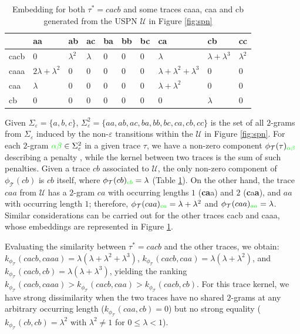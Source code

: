 {\begin{table}[!t]
\caption{Embedding for both $\tau^*=cacb$ and some traces caaa, caa and cb generated from the USPN $\mathcal{U}$ in Figure \ref{fig:spn}}\label{tb:embedding}
\begin{center}
	\begin{tabular}{l@{\quad }l@{\quad }l@{\quad }l@{\quad }l@{\quad }l@{\quad }l@{\quad }l@{\quad }l@{\quad }l}
		\toprule
		& aa    & ab   & ac    & ba   & bb   & bc & ca & cb & cc   \\
		\midrule
		cacb & $0$ & $\lambda^2$ & $\lambda$ & $0$  & $0$  & $0$ & $\lambda$ & $\lambda+\lambda^3$ & $\lambda^2$\\
		caaa & $2\lambda+\lambda^2$& $0$ & $0$ & $0$ & $0$ & $0$ & $\lambda+\lambda^2+\lambda^3$ & $0$ & $0$ \\
		caa  & $\lambda$ & $0$ & $0$ & $0$ & $0$ & $0$ & $\lambda+\lambda^2$ & $0$&  $0$\\
		cb   & $0$ & $0$ & $0$ & $0$ & $0$ & $0$ & $0$ & $\lambda$& $0$ \\
		\bottomrule
	\end{tabular}
\end{center}
\end{table}
\begin{example}\label{ex:wheredotiszero}
Given $\Sigma_\varepsilon=\{a,b,c\}$, $\Sigma^2_\varepsilon=\{aa,ab,ac,ba,bb,bc,ca,cb,cc\}$ is the set of all $2$-grams 
from $\Sigma_\varepsilon$ induced by the non-$\varepsilon$ transitions within the \uswn $\mathcal{U}$ in Figure \ref{fig:spn}. 
For each $2$-gram ${\color{green}\alpha\beta}\in\Sigma_\varepsilon^2$ in a given trace $\tau$, we have a non-zero component 
$\phi_{\mathcal{T}}(\tau)_{\color{green}\alpha\beta}$ describing a penalty \cite{Gartner03}, while the kernel between two 
traces is the sum of such penalties. Given a trace $cb$ associated to $\mathcal{U}$,  the only non-zero component of 
$\phi_{\mathcal{T}}(cb)$ is $cb$ itself, where $\phi_{\mathcal{T}}(cb)_{\color{green}cb}=\lambda$ (Table \ref{tb:embedding}). 
On the other hand, the trace $caa$ from $\mathcal{U}$ has a $2$-gram $ca$ with occurring lengths $1$ (\textbf{ca}a) and $2$ (\textbf{c}a\textbf{a}), and $aa$ with occurring length $1$; therefore, $\phi_{\mathcal{T}}(caa)_{\color{green}ca}=\lambda+\lambda^2$ and  $\phi_{\mathcal{T}}(caa)_{\color{green}aa}=\lambda$.  Similar considerations can be carried out for the other traces cacb and caaa, whose embeddings are represented in Figure \ref{tb:embedding}. 

Evaluating the similarity between $\tau^*=cacb$ and the other traces, we obtain: 
$k_{\phi_{\mathcal{T}}}(cacb,caaa)=\lambda(\lambda+\lambda^2+\lambda^3)$,  
$k_{\phi_{\mathcal{T}}}(cacb,caa)=\lambda(\lambda+\lambda^2)$, 
and $k_{\phi_{\mathcal{T}}}(cacb,cb)=\lambda(\lambda+\lambda^3)$, yielding the ranking $k_{\phi_{\mathcal{T}}}(cacb,caaa)>k_{\phi_{\mathcal{T}}}(cacb,caa)>k_{\phi_{\mathcal{T}}}(cacb,cb)$. For this trace kernel, we have strong dissimilarity when the two traces have no shared $2$-grams at any arbitrary occurring length ($k_{\phi_{\mathcal{T}}}(caa,cb)=0$) but no strong equality ($k_{\phi_{\mathcal{T}}}(cb,cb)=\lambda^2$ with $\lambda^2\neq 1$ for $0\leq \lambda<1$).
\end{example}

}
